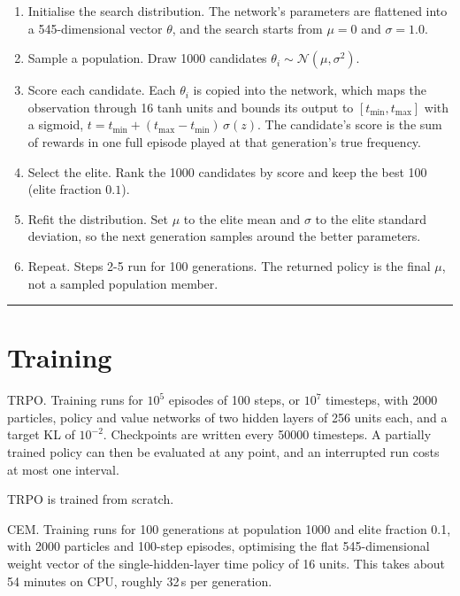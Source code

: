 \documentclass[12pt,a4paper]{article}
\begin{document}
\begin{enumerate}
  \item Initialise the search distribution. The network's parameters are flattened into a
  \num{545}-dimensional vector $\theta$, and the search starts from $\mu = 0$ and $\sigma = 1.0$.
  \item Sample a population. Draw \num{1000} candidates $\theta_i \sim \mathcal{N}(\mu, \sigma^2)$.
  \item Score each candidate. Each $\theta_i$ is copied into the network, which maps the observation
  through \num{16} tanh units and bounds its output to $[t_{\min}, t_{\max}]$ with a sigmoid,
  $t = t_{\min} + (t_{\max} - t_{\min})\,\sigma(z)$. The candidate's score is the sum of rewards in
  one full episode played at that generation's true frequency.
  \item Select the elite. Rank the \num{1000} candidates by score and keep the best \num{100}
  (elite fraction $0.1$).
  \item Refit the distribution. Set $\mu$ to the elite mean and $\sigma$ to the elite standard
  deviation, so the next generation samples around the better parameters.
  \item Repeat. Steps 2-5 run for \num{100} generations. The returned policy is the final $\mu$,
  not a sampled population member.
\end{enumerate}

\noindent\rule{\textwidth}{0.4pt}
\FloatBarrier

\section{Training}
\label{sec:training}
TRPO. Training runs for $10^5$ episodes of 100 steps, or $10^7$ timesteps, with \num{2000}
particles, policy and value networks of two hidden layers of 256 units each, and a target KL of
$10^{-2}$. Checkpoints are written every \num{50000} timesteps. A partially trained policy can then
be evaluated at any point, and an interrupted run costs at most one interval.

TRPO is trained from scratch.

CEM. Training runs for 100 generations at population 1000 and elite fraction 0.1, with 2000
particles and 100-step episodes, optimising the flat 545-dimensional weight vector of the
single-hidden-layer time policy of 16 units. This takes about 54 minutes on CPU, roughly 32\,s per
generation.
\end{document}
